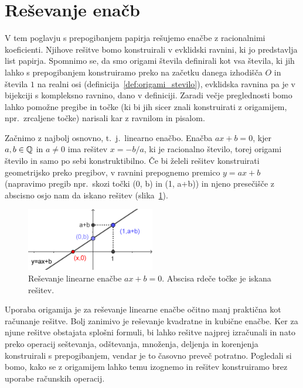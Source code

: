 \section{Reševanje enačb}
\label{pogl:enacbe}

V tem poglavju s prepogibanjem papirja rešujemo enačbe z racionalnimi koeficienti. Njihove rešitve bomo konstruirali v evklidski ravnini, ki jo predstavlja list papirja. Spomnimo se, da smo origami števila definirali kot vsa števila, ki jih lahko s prepogibanjem konstruiramo preko na začetku danega izhodišča $O$ in števila $1$ na realni osi (definicija~\ref{def:origami_stevilo}), evklidska ravnina pa je v bijekciji s kompleksno ravnino, dano v definiciji. Zaradi večje preglednosti bomo lahko pomožne pregibe in točke (ki bi jih sicer znali konstruirati z origamijem, npr.\ zrcaljene točke) narisali kar z ravnilom in pisalom.

Začnimo z najbolj osnovno, t.\ j.\ linearno enačbo. Enačba $ax + b = 0$, kjer $a, b \in \mathbb Q$ in $a \neq 0$ ima rešitev $x = -b/a$, ki je racionalno število, torej origami število in samo po sebi konstruktibilno. Če bi želeli rešitev konstruirati geometrijsko preko pregibov, v ravnini prepognemo premico $y = ax + b$ (napravimo pregib npr.\ skozi točki (0, b) in (1, a+b)) in njeno presečišče z abscisno osjo nam da iskano rešitev (slika~\ref{fig:lin_en}).

\begin{figure}[h]
    \centering
    \includegraphics[width=0.5\textwidth]{images/linearna_enacba.png}
    \caption[Reševanje linearne enačbe]{Reševanje linearne enačbe $ax+b=0$. Abscisa rdeče točke je iskana rešitev.}
    \label{fig:lin_en}
\end{figure}

Uporaba origamija je za reševanje linearne enačbe očitno manj praktična kot računanje rešitve. Bolj zanimivo je reševanje kvadratne in kubične enačbe. Ker za njune rešitve obstajata splošni formuli, bi lahko rešitve najprej izračunali in nato preko operacij seštevanja, odštevanja, množenja, deljenja in korenjenja konstruirali s prepogibanjem, vendar je to časovno preveč potratno. Pogledali si bomo, kako se z origamijem lahko temu izognemo in rešitev konstruiramo brez uporabe računskih operacij.

